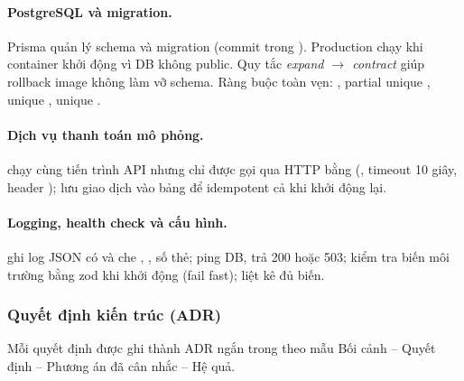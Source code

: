 \paragraph{PostgreSQL và migration.} Prisma quản lý schema và migration (commit trong
). Production chạy  khi container khởi động vì DB không
public. Quy tắc \textit{expand $\rightarrow$ contract} giúp rollback image không làm vỡ schema. Ràng buộc toàn vẹn:
, partial unique , unique
, unique .

\paragraph{Dịch vụ thanh toán mô phỏng.}  chạy cùng tiến trình API nhưng chỉ được gọi qua HTTP
bằng  (, timeout 10 giây, header ); lưu
giao dịch vào bảng  để idempotent cả khi khởi động lại.

\paragraph{Logging, health check và cấu hình.}  ghi log JSON có  và che
, , số thẻ;  ping DB, trả 200 hoặc 503; 
kiểm tra biến môi trường bằng zod khi khởi động (fail fast);  liệt kê đủ biến.

\subsubsection{Quyết định kiến trúc (ADR)}
Mỗi quyết định được ghi thành ADR ngắn trong  theo mẫu Bối cảnh -- Quyết định --
Phương án đã cân nhắc -- Hệ quả.

